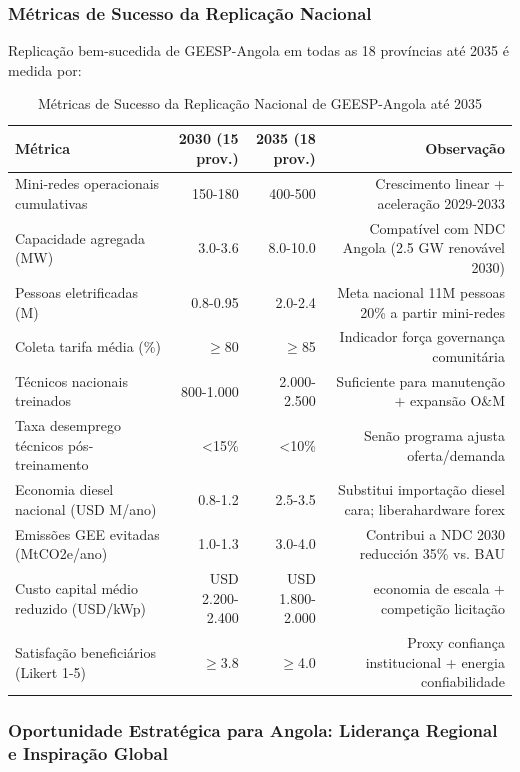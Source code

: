 \documentclass[12pt, a4paper]{article}
\begin{document}
{{{{{{{{{{{{\subsubsection{Métricas de Sucesso da Replicação Nacional}

Replicação bem-sucedida de GEESP-Angola em todas as 18 províncias até 2035 é medida por:

\begin{table}[H]
\centering
\caption{Métricas de Sucesso da Replicação Nacional de GEESP-Angola até 2035}
\label{tab:national_replication_metrics}
\small
\begin{tabular}{|l|r|r|r|}
\hline
\textbf{Métrica} & \textbf{2030 (15 prov.)} & \textbf{2035 (18 prov.)} & \textbf{Observação} \\
\hline
Mini-redes operacionais cumulativas & 150-180 & 400-500 & Crescimento linear + aceleração 2029-2033 \\
\hline
Capacidade agregada (MW) & 3.0-3.6 & 8.0-10.0 & Compatível com NDC Angola (2.5 GW renovável 2030) \\
\hline
Pessoas eletrificadas (M) & 0.8-0.95 & 2.0-2.4 & Meta nacional 11M pessoas ~20\% a partir mini-redes \\
\hline
Coleta tarifa média (\%) & $\geq$80 & $\geq$85 & Indicador força governança comunitária \\
\hline
Técnicos nacionais treinados & 800-1.000 & 2.000-2.500 & Suficiente para manutenção + expansão O\&M \\
\hline
Taxa desemprego técnicos pós-treinamento & <15\% & <10\% & Senão programa ajusta oferta/demanda \\
\hline
Economia diesel nacional (USD M/ano) & 0.8-1.2 & 2.5-3.5 & Substitui importação diesel cara; liberahardware forex \\
\hline
Emissões GEE evitadas (MtCO2e/ano) & 1.0-1.3 & 3.0-4.0 & Contribui a NDC 2030 reducción 35\% vs. BAU \\
\hline
Custo capital médio reduzido (USD/kWp) & USD 2.200-2.400 & USD 1.800-2.000 & economia de escala + competição licitação \\
\hline
Satisfação beneficiários (Likert 1-5) & $\geq$3.8 & $\geq$4.0 & Proxy confiança institucional + energia confiabilidade \\
\hline
\end{tabular}
\end{table}

\subsubsection{Oportunidade Estratégica para Angola: Liderança Regional e Inspiração Global}

}}}}}}}}}}}}
\end{document}
